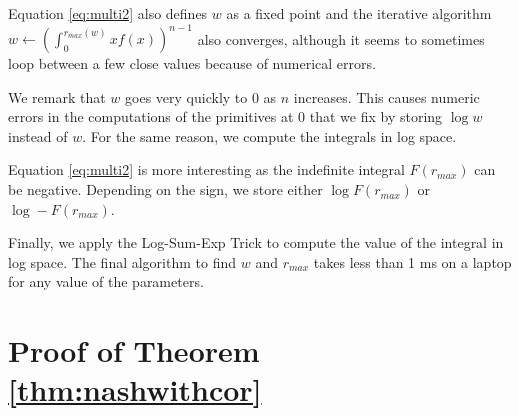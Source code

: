 \documentclass[preprint,12pt,authoryear]{elsarticle}
\theoremstyle{definition}
\begin{document}
Equation \eqref{eq:multi2} also defines $w$ as a fixed point and the iterative algorithm $w \leftarrow \left(\int_0^{{r_{max}}(w)}x f(x)\right)^{n-1}$ also converges, although it seems to sometimes loop between a few close values because of numerical errors.

We remark that $w$ goes very quickly to $0$ as $n$ increases. This causes numeric errors in the computations of the primitives at $0$ that we fix by storing $\log w$ instead of $w$.  For the same reason, we compute the integrals in log space.

Equation \eqref{eq:multi2} is more interesting as the indefinite integral $F({r_{max}})$ can be negative. Depending on the sign, we store either $\log F({r_{max}})$ or $\log -F({r_{max}})$.

Finally, we apply the Log-Sum-Exp Trick to compute the value of the integral in log space. The final algorithm to find $w$ and ${r_{max}}$ takes less than 1 ms on a laptop for any value of the parameters.

\section{Proof of Theorem \ref{thm:nashwithcor}}
\label{proof:nashwithcor}
\end{document}
